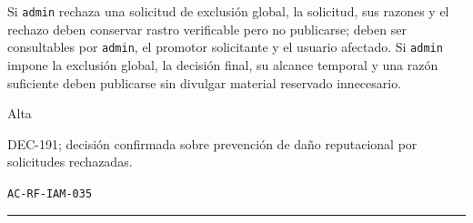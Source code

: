 \documentclass[10pt,letterpaper]{article}
\begin{document}
\begin{description}[style=nextline,leftmargin=3.15cm,labelwidth=2.8cm,font=\normalfont\bfseries]
\item[Obligación] Si \texttt{admin} rechaza una solicitud de exclusión global, la solicitud, sus razones y el rechazo deben conservar rastro verificable pero no publicarse; deben ser consultables por \texttt{admin}, el promotor solicitante y el usuario afectado. Si \texttt{admin} impone la exclusión global, la decisión final, su alcance temporal y una razón suficiente deben publicarse sin divulgar material reservado innecesario.
\item[Prioridad] Alta
\item[Procedencia] DEC-191; decisión confirmada sobre prevención de daño reputacional por solicitudes rechazadas.
\item[Verificación] \texttt{AC-RF-IAM-035}
\end{description}
\vspace{0.25em}\hrule\vspace{0.65em}
\end{document}
